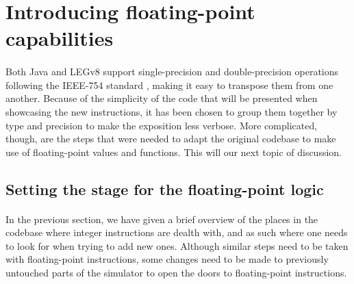 \section{Introducing floating-point capabilities}\label{chap:chap4float}
\paragraph{}
Both Java and LEGv8 support single-precision and double-precision operations following the IEEE-754 standard \cite{ieee754}, making it easy to transpose them from one another. Because of the simplicity of the code that will be presented when showcasing the new instructions, it has been chosen to group them together by type and precision to make the exposition less verbose. More complicated, though, are the steps that were needed to adapt the original codebase to make use of floating-point values and functions. This will our next topic of discussion.
\subsection{Setting the stage for the floating-point logic}
\paragraph{}
In the previous section, we have given a brief overview of the places in the codebase where integer instructions are dealth with, and as such where one needs to look for when trying to add new ones. Although similar steps need to be taken with floating-point instructions, some changes need to be made to previously untouched parts of the simulator to open the doors to floating-point instructions.
